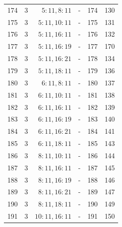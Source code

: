 \begin{center}
\begin{tabular}{rrrrrr}
174 & 3 & $5:11,8:11$ & - & 174 & 130\\
175 & 3 & $5:11,10:11$ & - & 175 & 131\\
176 & 3 & $5:11,16:11$ & - & 176 & 132\\
177 & 3 & $5:11,16:19$ & - & 177 & 170\\
178 & 3 & $5:11,16:21$ & - & 178 & 134\\
179 & 3 & $5:11,18:11$ & - & 179 & 136\\
180 & 3 & $6:11,8:11$ & - & 180 & 137\\
181 & 3 & $6:11,10:11$ & - & 181 & 138\\
182 & 3 & $6:11,16:11$ & - & 182 & 139\\
183 & 3 & $6:11,16:19$ & - & 183 & 140\\
184 & 3 & $6:11,16:21$ & - & 184 & 141\\
185 & 3 & $6:11,18:11$ & - & 185 & 143\\
186 & 3 & $8:11,10:11$ & - & 186 & 144\\
187 & 3 & $8:11,16:11$ & - & 187 & 145\\
188 & 3 & $8:11,16:19$ & - & 188 & 146\\
189 & 3 & $8:11,16:21$ & - & 189 & 147\\
190 & 3 & $8:11,18:11$ & - & 190 & 149\\
191 & 3 & $10:11,16:11$ & - & 191 & 150\\
\bottomrule\end{tabular}\end{center}\clearpage
